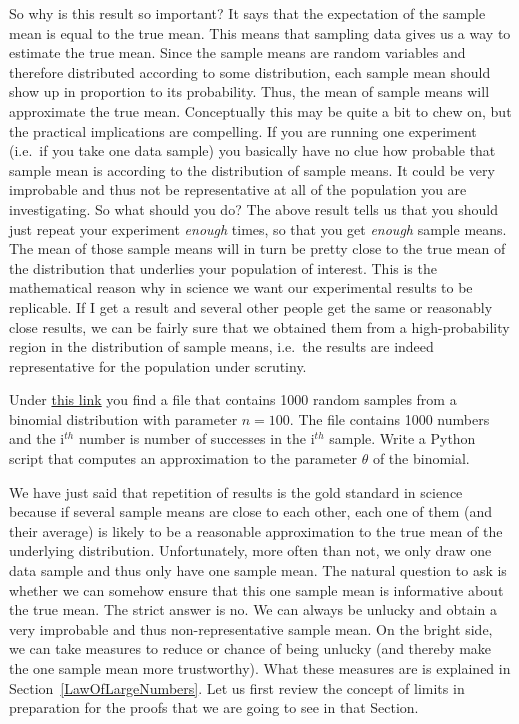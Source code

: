 So why is this result so important? It says that the expectation of the sample mean is equal to the true
mean. This means that sampling data gives us a way to estimate the true mean. Since the sample means are random variables and therefore distributed according
to some distribution, each sample mean should show up in proportion to its probability. Thus, the mean
of sample means will approximate the true mean. Conceptually this may be quite a bit to chew on, but the practical implications are compelling.
If you are running one experiment (i.e.\ if you take one data sample) you basically have no clue how probable that sample mean is according
to the distribution of sample means. It could be very improbable and thus not be representative at all of the population you are investigating.
So what should you do? The above result tells us that you should just repeat your experiment \textit{enough} times, so that you get
\textit{enough} sample means. The mean of those sample means will in turn be pretty close to the true mean of the distribution that underlies your population
of interest. This is the mathematical reason why in science we want our experimental results to be replicable. If I get a result
and several other people get the same or reasonably close results, we can be fairly sure that we obtained them from a high-probability region
in the distribution of sample means, i.e.\ the results are indeed representative for the population under scrutiny.

\begin{Exercise}
Under \href{https://github.com/BasicProbability/LectureNotes/blob/master/chapter5/BernoulliData.txt}{this link} you find a file that contains 1000 random samples from
a binomial distribution with parameter $ n = 100 $. The file contains 1000 numbers and the i$ ^{th} $ number is number of successes in the i$ ^{th} $ sample. Write
a Python script that computes an approximation to the parameter $ \theta $ of the binomial.
\end{Exercise}

We have just said that repetition of results is the gold standard in science because if several sample means
are close to each other, each one of them (and their average) is likely to be a reasonable approximation
to the true mean of the underlying distribution. Unfortunately, more often than not, we only draw
one data sample and thus only have one sample mean. The natural question to ask is whether we can
somehow ensure that this one sample mean is informative about the true mean. The strict answer is no.
We can always be unlucky and obtain a very improbable and thus non-representative sample mean. On the bright
side, we can take measures to reduce or chance of being unlucky (and thereby make the one sample mean more
trustworthy). What these measures are is explained in Section~\ref{LawOfLargeNumbers}. Let us first
review the concept of limits in preparation for the proofs that we are going to see in that Section.

